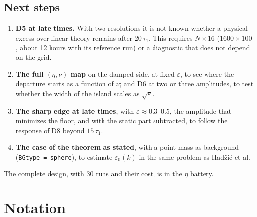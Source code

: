 \documentclass[11pt,a4paper]{article}
\begin{document}
\subsection{Next steps}
\label{sec:siguiente}

\begin{enumerate}
\item \textbf{D5 at late times.} With two resolutions it is not known whether a physical
excess over linear theory remains after $20\,\tau_1$. This requires $N\times16$
($1600\times100$, about 12 hours with its reference run) or a diagnostic that does not
depend on the grid.
\item \textbf{The full $(\eta,\nu)$ map} on the damped side, at fixed $\varepsilon$, to see
where the departure starts as a function of $\nu$; and D6 at two or three amplitudes, to
test whether the width of the island scales as $\sqrt\varepsilon$.
\item \textbf{The sharp edge at late times}, with $\varepsilon\approx0.3$--$0.5$, the amplitude
that minimizes the floor, and with the static part subtracted, to follow the response of
D8 beyond $15\,\tau_1$.
\item \textbf{The case of the theorem as stated}, with a point mass as background
(\texttt{BGtype = sphere}), to estimate $\varepsilon_0(k)$ in the same problem as Hadžić et al.
\end{enumerate}
The complete design, with 30 runs and their cost, is in the $\eta$ battery.

\clearpage
\appendix

\section{Notation}
\label{sec:glosario}
\end{document}
